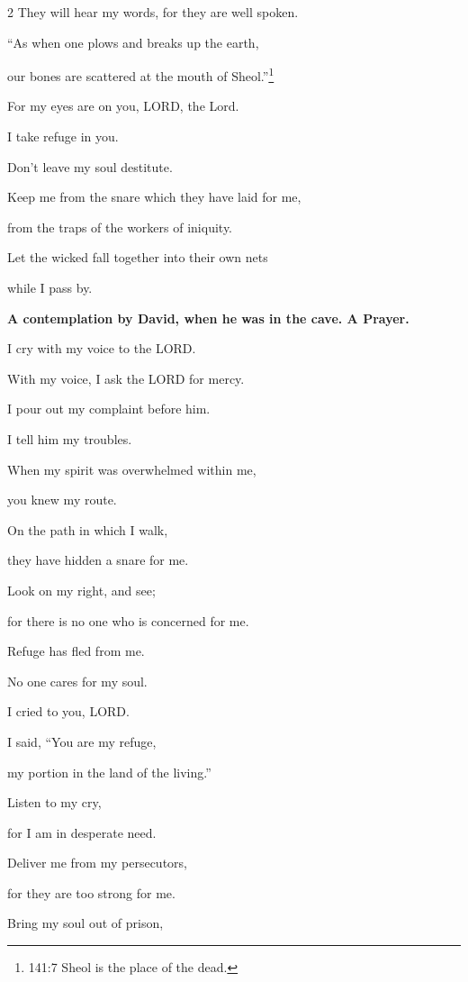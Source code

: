 \begin{multicols}{2}
	They will hear my words, for they are well spoken.
	
	
	\myverse{}“As when one plows and breaks up the earth,
	
	our bones are scattered at the mouth of Sheol.”\footnote{141:7 Sheol is the place of the dead.}
	
	
	\myverse{}For my eyes are on you, LORD, the Lord.
	
	I take refuge in you.
	
	Don’t leave my soul destitute.
	
	
	\myverse{}Keep me from the snare which they have laid for me,
	
	from the traps of the workers of iniquity.
	
	
	\myverse{}Let the wicked fall together into their own nets
	
	while I pass by.
	
	
	\mychapter{}\textbf{A contemplation by David, when he was in the cave. A Prayer.}
	
	 \myverse*{}I cry with my voice to the LORD.
	
	With my voice, I ask the LORD for mercy.
	
	
	\myverse{}I pour out my complaint before him.
	
	I tell him my troubles.
	
	
	\myverse{}When my spirit was overwhelmed within me,
	
	you knew my route.
	
	On the path in which I walk,
	
	they have hidden a snare for me.
	
	
	\myverse{}Look on my right, and see;
	
	for there is no one who is concerned for me.
	
	Refuge has fled from me.
	
	No one cares for my soul.
	
	
	\myverse{}I cried to you, LORD.
	
	I said, “You are my refuge,
	
	my portion in the land of the living.”
	
	
	\myverse{}Listen to my cry,
	
	for I am in desperate need.
	
	Deliver me from my persecutors,
	
	for they are too strong for me.
	
	
	\myverse{}Bring my soul out of prison,
	

\end{multicols}
